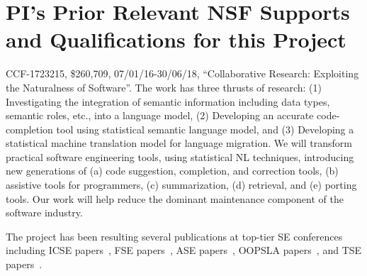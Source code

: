 \section{PI's Prior Relevant NSF Supports and Qualifications for this Project}
\label{prior-section}

CCF-1723215, \$260,709, 07/01/16-30/06/18, ``Collaborative
Research: Exploiting the Naturalness of Software''. 
%
 The work has three thrusts of
research: (1) Investigating the integration of semantic information
including data types, semantic roles, etc., into a language model, (2)
Developing an accurate code-completion tool using statistical semantic
language model, and (3) Developing a statistical machine translation
model for language migration.
%
 We will transform practical software
engineering tools, using statistical NL techniques, introducing new
generations of (a) code suggestion, completion, and correction tools,
(b) assistive tools for programmers, (c)
summarization, (d) retrieval, and (e) porting tools.  Our work will
help reduce the dominant maintenance component of the software
industry.



The project has been resulting several publications at top-tier SE
conferences including ICSE
papers~\cite{icse05,icse07,icse09,icse10,icse11}, FSE
papers~\cite{fse06,fse09,fse11}, ASE
papers~\cite{ase06,ase08,ase08-2,ase09,ase10,ase11-phpsync,ase11-bugscout,ase11-idiff},
OOPSLA papers~\cite{oopsla04,oopsla06,oopsla10}, and TSE
papers~\cite{tse08,tse11}.


